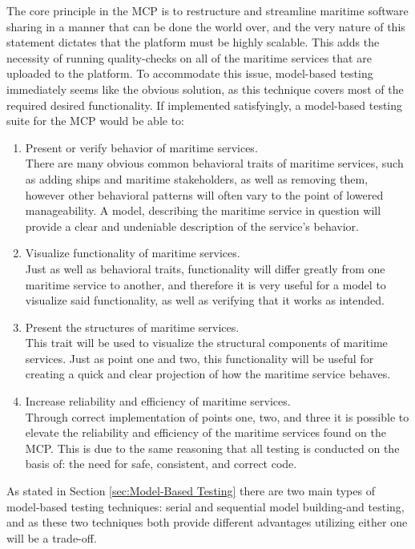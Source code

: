 The core principle in the MCP is to restructure and streamline maritime software sharing in a manner that can be done the world over, and the very nature of this statement dictates that the platform must be highly scalable. This adds the necessity of running quality-checks on all of the maritime services that are uploaded to the platform. To accommodate this issue, model-based testing immediately seems like the obvious solution, as this technique covers most of the required desired functionality. If implemented satisfyingly, a model-based testing suite for the MCP would be able to:
\begin{enumerate}
	\item Present or verify behavior of maritime services.\\
		There are many obvious common behavioral traits of maritime services, such as adding ships and maritime stakeholders, as well as removing them, however other behavioral patterns will often vary to the point of lowered manageability. A model, describing the maritime service in question will provide a clear and undeniable description of the service's behavior.\newpage
	\item Visualize functionality of maritime services.\\
		Just as well as behavioral traits, functionality will differ greatly from one maritime service to another, and therefore it is very useful for a model to visualize said functionality, as well as verifying that it works as intended.
	\item Present the structures of maritime services.\\
		This trait will be used to visualize the structural components of maritime services. Just as point one and two, this functionality will be useful for creating a quick and clear projection of how the maritime service behaves.
	\item Increase reliability and efficiency of maritime services.\\
		Through correct implementation of points one, two, and three it is possible to elevate the reliability and efficiency of the maritime services found on the MCP. This is due to the same reasoning that all testing is conducted on the basis of: the need for safe, consistent, and correct code.
\end{enumerate}
\noindent
As stated in Section \ref{sec:Model-Based Testing} there are two main types of model-based testing techniques: serial and sequential model building-and testing, and as these two techniques both provide different advantages utilizing either one will be a trade-off.\newpage

